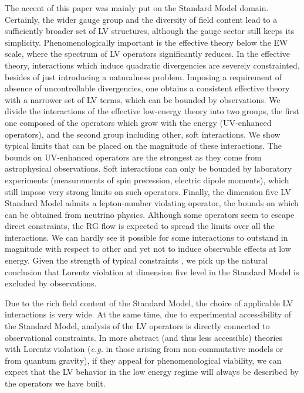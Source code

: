 \documentclass[12pt,preprintnumbers,nofootinbib]{revtex4}
\begin{document}
	The accent of this paper was mainly put on the Standard Model 
	domain.
	Certainly, the wider gauge group and the diversity of field content lead
	to a sufficiently broader set of LV structures, although the gauge
	sector still keeps its simplicity.
	Phenomenologically important is the effective theory below the EW scale, where
	the spectrum of LV operators significantly reduces. 
	In the effective theory, interactions which induce quadratic divergencies 
	are severely constrainted, besides of just introducing a naturalness problem. 
	Imposing a requirement of absence of uncontrollable divergencies,
	one obtains a consistent effective theory with a narrower set of LV terms, which 
	can be bounded by observations.
	We divide the interactions of the effective low-energy theory into two groups,
	the first one composed of the operators which grow with the energy (UV-enhanced
	operators), and the second group including other, soft interactions. 
	We show typical limits that can be placed on the magnitude of these
	interactions.	
	The bounds on UV-enhanced operators are the strongest as they come from astrophysical observations.
	Soft interactions can only be bounded by laboratory experiments (measurements of spin precession,
	electric dipole moments), which still impose very strong limits on such operators.
	Finally, the dimension five LV Standard Model admits a lepton-number violating
	operator, the bounds on which can be obtained from neutrino physics.
	Although some operators seem to escape direct constraints, the RG
	flow is expected to spread the limits over all the interactions.
	We can hardly see it possible for some interactions to outstand in magnitude 
	with respect to other and yet not to induce observable effects at low
	energy. 
	Given the strength of typical constraints 
\cite{Gagnon:2004xh}, we pick up the natural 
	conclusion that Lorentz violation at dimension five level in the Standard
	Model is excluded by observations.

	Due to the rich field content of the Standard Model,
	the choice of applicable LV interactions is very wide. 
	At the same time, due to experimental accessibility of the
	Standard Model, analysis of the LV operators is directly connected to 
	observational constraints.
	In more abstract (and thus less accessible) theories with Lorentz violation 
	({\it e.g.} in those arising from non-commutative models or from quantum gravity),
	if they appeal for phenomenological
	viability, we can expect that the LV behavior in the low energy regime will 
	always be described by the operators we have built.
\end{document}
